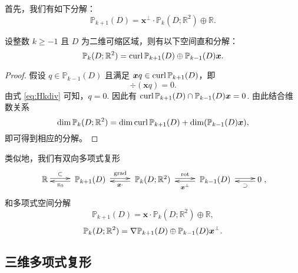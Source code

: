 首先，我们有如下分解：
\[
\mathbb P_{k+1}(D) = \boldsymbol x^{\perp}\cdot\mathbb P_k(D;\mathbb R^2)\oplus\mathbb R.
\]

\begin{lemma}\label{lem:symmpolyspacedirectsum}
设整数 $k \geq -1$ 且 $D$ 为二维可缩区域，则有以下空间直和分解：
 \begin{equation}\label{eq:vector2polyspacedecomp2}
\mathbb P_{k}(D;\mathbb R^2)=\operatorname{curl}\mathbb P_{k+1}(D)\oplus\mathbb P_{k-1}(D)\boldsymbol x.
\end{equation}
\end{lemma}
\begin{proof}
假设 $q\in\mathbb P_{k-1}(D)$ 且满足 $\boldsymbol xq\in\operatorname{curl}\mathbb P_{k+1}(D)$，即
\[
\div(\boldsymbol  xq)=0.
\]
由式 \eqref{eq:Hkdiv} 可知，$q=0$.
因此有
$\operatorname{curl}\mathbb P_{k+1}(D)\cap\mathbb P_{k-1}(D)\boldsymbol x=0$. 
由此结合维数关系
\[
\dim \mathbb P_k(D;\mathbb R^2) = \dim \operatorname{curl} \mathbb P_{k+1}(D) + \dim (\mathbb P_{k-1}(D)\boldsymbol x),
\]
即可得到相应的分解。
\end{proof}

类似地，我们有双向多项式复形
\begin{equation*}
\xymatrix{
\mathbb R\ar@<0.4ex>[r]^-{\subset} & \; \mathbb P_{k+1}(D)\; \ar@<0.4ex>[r]^-{\grad}\ar@<0.4ex>[l]^-{\pi_0}  & \; \mathbb P_k(D;\mathbb R^2) \ar@<0.4ex>[r]^-{\rot}\; \ar@<0.4ex>[l]^-{\boldsymbol x\cdot} & \; \mathbb P_{k-1}(D)  \; \ar@<0.4ex>[r]^-{} \ar@<0.4ex>[l]^-{\boldsymbol x^{\bot}}
& 0 \ar@<0.4ex>[l]^-{\supset} },
\end{equation*}
和多项式空间分解
\[
\mathbb P_{k+1}(D) = \boldsymbol x\cdot\mathbb P_k(D;\mathbb R^2)\oplus\mathbb R,
\]
\[
\mathbb P_{k}(D;\mathbb R^2)=\nabla\mathbb P_{k+1}(D)\oplus\mathbb P_{k-1}(D)\boldsymbol x^{\perp}.
\]


\subsection{三维多项式复形}


